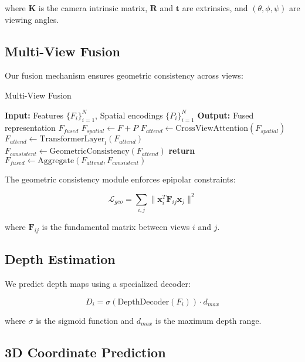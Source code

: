 \documentclass[11pt,a4paper]{article}
\begin{document}
where $\mathbf{K}$ is the camera intrinsic matrix, $\mathbf{R}$ and $\mathbf{t}$ are extrinsics, and $(\theta, \phi, \psi)$ are viewing angles.

\subsection{Multi-View Fusion}

Our fusion mechanism ensures geometric consistency across views:

\begin{algorithm}
\caption{Multi-View Fusion}
\begin{algorithmic}[1]
\STATE \textbf{Input:} Features $\{F_i\}_{i=1}^N$, Spatial encodings $\{P_i\}_{i=1}^N$
\STATE \textbf{Output:} Fused representation $F_{fused}$
\STATE $F_{spatial} \leftarrow F + P$ 
\STATE $F_{attend} \leftarrow \text{CrossViewAttention}(F_{spatial})$
    \STATE $F_{attend} \leftarrow \text{TransformerLayer}_l(F_{attend})$
\ENDFOR
\STATE $F_{consistent} \leftarrow \text{GeometricConsistency}(F_{attend})$
\STATE \textbf{return} $F_{fused} \leftarrow \text{Aggregate}(F_{attend}, F_{consistent})$
\end{algorithmic}
\end{algorithm}

The geometric consistency module enforces epipolar constraints:

\begin{equation}
\mathcal{L}_{geo} = \sum_{i,j} \|\mathbf{x}_i^T \mathbf{F}_{ij} \mathbf{x}_j\|^2
\end{equation}

where $\mathbf{F}_{ij}$ is the fundamental matrix between views $i$ and $j$.

\subsection{Depth Estimation}

We predict depth maps using a specialized decoder:

\begin{equation}
D_i = \sigma(\text{DepthDecoder}(F_i)) \cdot d_{max}
\end{equation}

where $\sigma$ is the sigmoid function and $d_{max}$ is the maximum depth range.

\subsection{3D Coordinate Prediction}
\end{document}

